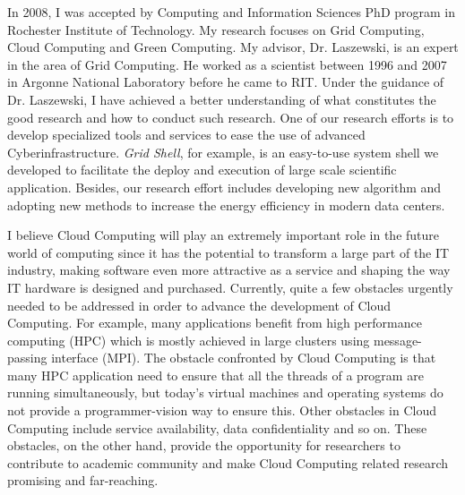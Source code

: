 \documentclass[12pt]{article}
\begin{document}
In 2008, I was accepted by Computing and Information Sciences PhD program in Rochester Institute of Technology. My research focuses on Grid Computing, Cloud Computing and Green Computing. My advisor, Dr. Laszewski, is an expert in the area of Grid Computing. He worked as a scientist between 1996 and 2007 in Argonne National Laboratory before he came to RIT. Under the guidance of Dr. Laszewski, I have achieved a better understanding of what constitutes the good research and how to conduct such research. One of our research efforts is to develop specialized tools and services to ease the use of advanced Cyberinfrastructure. {\em Grid Shell}, for example, is an easy-to-use system shell we developed to facilitate the deploy and execution of large scale scientific application. Besides, our research effort includes developing new algorithm and adopting new methods to increase the energy efficiency in modern data centers.



I believe Cloud Computing will play an extremely important role in the future world of computing since it has the potential to transform a large part of the IT industry, making software even more attractive as a service and shaping the way IT hardware is designed and purchased. Currently, quite a few obstacles urgently needed to be addressed in order to advance the development of Cloud Computing. For example, many applications benefit from high performance computing (HPC) which is mostly achieved in large clusters using message-passing interface (MPI). The obstacle confronted by Cloud Computing is that many HPC application need to ensure that all the threads of a program are running simultaneously, but today's virtual machines and operating systems do not provide a programmer-vision way to ensure this. Other obstacles in Cloud Computing include service availability, data confidentiality and so on. These obstacles, on the other hand, provide the opportunity for researchers to contribute to academic community and make Cloud Computing related research promising and far-reaching.
\end{document}
